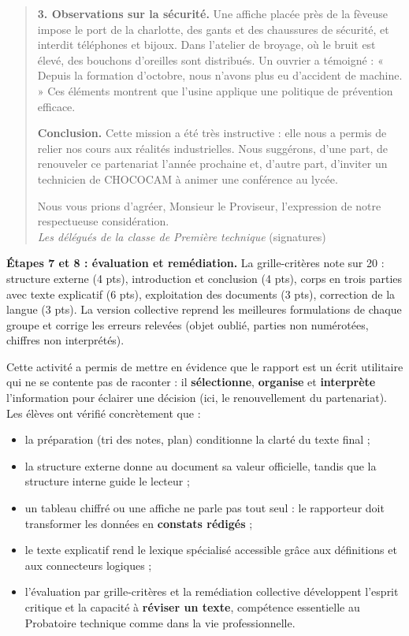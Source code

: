 \documentclass[11pt]{article}
\newcommand{\cle}[1]{{\popxbold\color{popdark}#1}}
\newcounter{popsec}
\newcounter{popsub}
\newcommand{\courssub}[1]{%
  \stepcounter{popsub}%
  \par\vspace{9pt}\noindent{\popxbold\fontsize{11.5}{13}\selectfont\color{popink}{\color{poporange}\thepopsec.\thepopsub}\hspace{6pt}#1}\par\nopagebreak\vspace{4pt}
}
\begin{document}
\begin{exoresolu}
\begin{quote}
\textbf{3. Observations sur la sécurité.} Une affiche placée près de la fèveuse impose le port de la charlotte, des gants et des chaussures de sécurité, et interdit téléphones et bijoux. Dans l'atelier de broyage, où le bruit est élevé, des bouchons d'oreilles sont distribués. Un ouvrier a témoigné : « Depuis la formation d'octobre, nous n'avons plus eu d'accident de machine. » Ces éléments montrent que l'usine applique une politique de prévention efficace.

\textbf{Conclusion.} Cette mission a été très instructive : elle nous a permis de relier nos cours aux réalités industrielles. Nous suggérons, d'une part, de renouveler ce partenariat l'année prochaine et, d'autre part, d'inviter un technicien de CHOCOCAM à animer une conférence au lycée.

Nous vous prions d'agréer, Monsieur le Proviseur, l'expression de notre respectueuse considération.\\
\emph{Les délégués de la classe de Première technique} (signatures)
\end{quote}

\textbf{Étapes 7 et 8 : évaluation et remédiation.} La grille-critères note sur 20 : structure externe (4 pts), introduction et conclusion (4 pts), corps en trois parties avec texte explicatif (6 pts), exploitation des documents (3 pts), correction de la langue (3 pts). La version collective reprend les meilleures formulations de chaque groupe et corrige les erreurs relevées (objet oublié, parties non numérotées, chiffres non interprétés).
\end{exoresolu}

\courssub{Bilan de l'activité}

Cette activité a permis de mettre en évidence que le rapport est un \cle{écrit utilitaire} qui ne se contente pas de raconter : il \textbf{sélectionne}, \textbf{organise} et \textbf{interprète} l'information pour éclairer une décision (ici, le renouvellement du partenariat). Les élèves ont vérifié concrètement que :
\begin{itemize}
\item la \cle{préparation} (tri des notes, plan) conditionne la clarté du texte final ;
\item la \cle{structure externe} donne au document sa valeur officielle, tandis que la \cle{structure interne} guide le lecteur ;
\item un tableau chiffré ou une affiche ne parle pas tout seul : le rapporteur doit transformer les données en \textbf{constats rédigés} ;
\item le \cle{texte explicatif} rend le lexique spécialisé accessible grâce aux définitions et aux connecteurs logiques ;
\item l'évaluation par grille-critères et la remédiation collective développent l'esprit critique et la capacité à \textbf{réviser un texte}, compétence essentielle au Probatoire technique comme dans la vie professionnelle.
\end{itemize}
\end{document}
